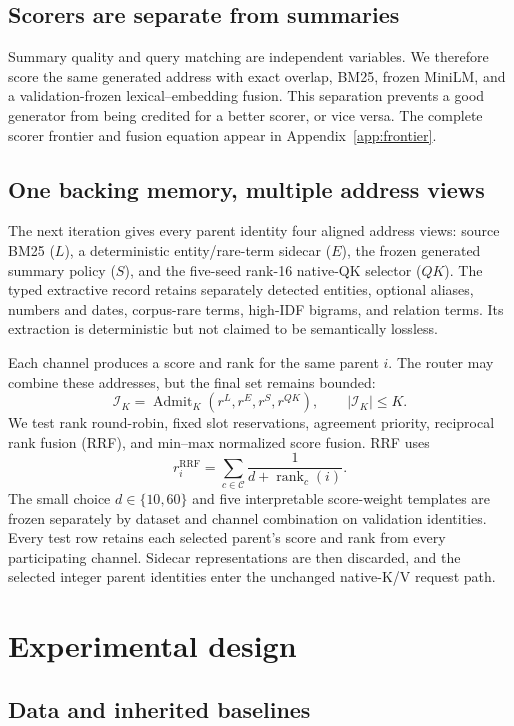 \documentclass[11pt]{article}
\newcommand{\kv}{K/V\xspace}
\begin{document}
\subsection{Scorers are separate from summaries}

Summary quality and query matching are independent variables. We therefore
score the same generated address with exact overlap, BM25, frozen MiniLM, and a
validation-frozen lexical--embedding fusion. This separation prevents a good
generator from being credited for a better scorer, or vice versa. The complete
scorer frontier and fusion equation appear in Appendix~\ref{app:frontier}.

\subsection{One backing memory, multiple address views}

The next iteration gives every parent identity four aligned address views:
source BM25 ($L$), a deterministic entity/rare-term sidecar ($E$), the frozen
generated summary policy ($S$), and the five-seed rank-16 native-QK selector
($QK$). The typed extractive record retains separately detected entities,
optional aliases, numbers and dates, corpus-rare terms, high-IDF bigrams, and
relation terms. Its extraction is deterministic but not claimed to be
semantically lossless.

Each channel produces a score and rank for the same parent $i$. The router may
combine these addresses, but the final set remains bounded:
\[
\mathcal I_K=\operatorname{Admit}_K
  (r^L,r^E,r^S,r^{QK}),\qquad |\mathcal I_K|\le K.
\]
We test rank round-robin, fixed slot reservations, agreement priority,
reciprocal rank fusion (RRF), and min--max normalized score fusion. RRF uses
\[
r_i^{\mathrm{RRF}}=\sum_{c\in\mathcal C}\frac{1}{d+\operatorname{rank}_c(i)}.
\]
The small choice $d\in\{10,60\}$ and five interpretable score-weight templates
are frozen separately by dataset and channel combination on validation
identities. Every test row retains each selected parent's score and rank from
every participating channel. Sidecar representations are then discarded, and
the selected integer parent identities enter the unchanged native-\kv request
path.

\section{Experimental design}

\subsection{Data and inherited baselines}
\end{document}

